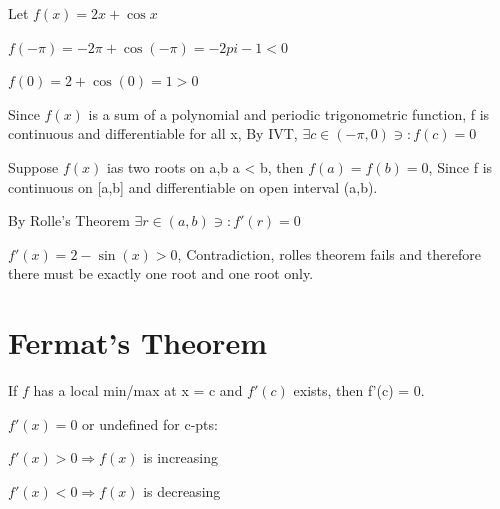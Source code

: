 \documentclass{article}
\begin{document}
Let $f(x) = 2x + \cos x$

$f(- \pi) = -2\pi + \cos(-\pi) = -2pi - 1 < 0$

$f(0) = 2 + \cos(0) = 1 > 0$

Since $f(x)$ is a sum of a polynomial and periodic trigonometric function, f is continuous and differentiable for all x, By IVT, $\exists c \in (-\pi ,0) \ni: f(c) = 0$

Suppose $f(x)$ ias two roots  on a,b a < b, then $f(a) = f(b) = 0$, Since f is continuous on [a,b] and differentiable on open interval (a,b).

By Rolle's Theorem $\exists r \in (a,b) \ni: f'(r) = 0$

$f'(x) = 2 - \sin(x) > 0$, Contradiction, rolles theorem fails and therefore there must be exactly one root and one root only. 

\pagebreak

\text{}

\section{Fermat's Theorem}


If $f$ has a local min/max at x = c and $f'(c)$ exists, then f'(c) = 0.

$f'(x) = 0$ or undefined for c-pts:

$f'(x) > 0 \Rightarrow f(x)$ is increasing

$f'(x) < 0 \Rightarrow f(x)$ is decreasing
\end{document}
